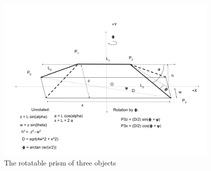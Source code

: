 \documentclass[11pt]{article}
\begin{document}
\begin{figure}
     \centering
     \includegraphics[width=0.95\textwidth]{figures/StackedSetup.png}
     \caption{The rotatable prism of three objects}
  \label{fig:prismdiagram}
\end{figure}
\end{document}
